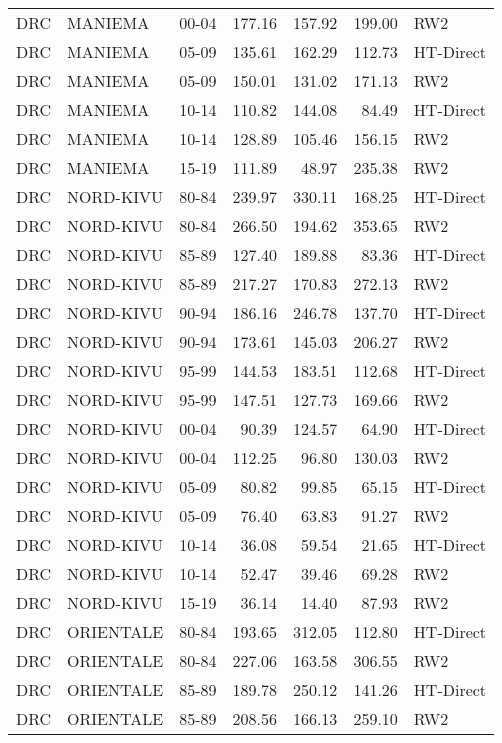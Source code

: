 \begin{longtable}{lllrrrl}
  DRC & MANIEMA & 00-04 & 177.16 & 157.92 & 199.00 & RW2 \\ 
  DRC & MANIEMA & 05-09 & 135.61 & 162.29 & 112.73 & HT-Direct \\ 
  DRC & MANIEMA & 05-09 & 150.01 & 131.02 & 171.13 & RW2 \\ 
  DRC & MANIEMA & 10-14 & 110.82 & 144.08 & 84.49 & HT-Direct \\ 
  DRC & MANIEMA & 10-14 & 128.89 & 105.46 & 156.15 & RW2 \\ 
  DRC & MANIEMA & 15-19 & 111.89 & 48.97 & 235.38 & RW2 \\ 
  DRC & NORD-KIVU & 80-84 & 239.97 & 330.11 & 168.25 & HT-Direct \\ 
  DRC & NORD-KIVU & 80-84 & 266.50 & 194.62 & 353.65 & RW2 \\ 
  DRC & NORD-KIVU & 85-89 & 127.40 & 189.88 & 83.36 & HT-Direct \\ 
  DRC & NORD-KIVU & 85-89 & 217.27 & 170.83 & 272.13 & RW2 \\ 
  DRC & NORD-KIVU & 90-94 & 186.16 & 246.78 & 137.70 & HT-Direct \\ 
  DRC & NORD-KIVU & 90-94 & 173.61 & 145.03 & 206.27 & RW2 \\ 
  DRC & NORD-KIVU & 95-99 & 144.53 & 183.51 & 112.68 & HT-Direct \\ 
  DRC & NORD-KIVU & 95-99 & 147.51 & 127.73 & 169.66 & RW2 \\ 
  DRC & NORD-KIVU & 00-04 & 90.39 & 124.57 & 64.90 & HT-Direct \\ 
  DRC & NORD-KIVU & 00-04 & 112.25 & 96.80 & 130.03 & RW2 \\ 
  DRC & NORD-KIVU & 05-09 & 80.82 & 99.85 & 65.15 & HT-Direct \\ 
  DRC & NORD-KIVU & 05-09 & 76.40 & 63.83 & 91.27 & RW2 \\ 
  DRC & NORD-KIVU & 10-14 & 36.08 & 59.54 & 21.65 & HT-Direct \\ 
  DRC & NORD-KIVU & 10-14 & 52.47 & 39.46 & 69.28 & RW2 \\ 
  DRC & NORD-KIVU & 15-19 & 36.14 & 14.40 & 87.93 & RW2 \\ 
  DRC & ORIENTALE & 80-84 & 193.65 & 312.05 & 112.80 & HT-Direct \\ 
  DRC & ORIENTALE & 80-84 & 227.06 & 163.58 & 306.55 & RW2 \\ 
  DRC & ORIENTALE & 85-89 & 189.78 & 250.12 & 141.26 & HT-Direct \\ 
  DRC & ORIENTALE & 85-89 & 208.56 & 166.13 & 259.10 & RW2 \\ 

\end{longtable}
